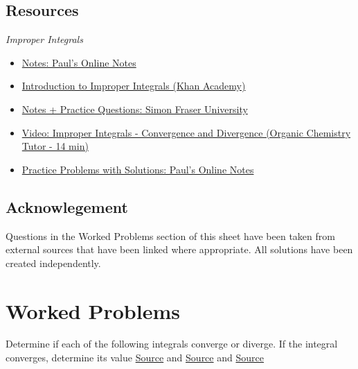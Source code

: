 \documentclass{article}
\begin{document}
\subsection*{Resources}
\noindent\textit{Improper Integrals}
\begin{itemize}
    \item \href{https://tutorial.math.lamar.edu/classes/calcii/improperintegrals.aspx}{Notes: Paul's Online Notes}
    \item \href{https://www.khanacademy.org/math/ap-calculus-bc/bc-integration-new/bc-6-13/v/introduction-to-improper-integrals}{Introduction to Improper Integrals (Khan Academy)}
    \item \href{https://www.sfu.ca/math-coursenotes/Math%20158%20Course%20Notes/sec_ImproperIntegrals.html}{Notes + Practice Questions: Simon Fraser University}
    \item \href{https://youtu.be/ND9cEdfCFr0}{Video: Improper Integrals - Convergence and Divergence (Organic Chemistry Tutor - 14 min)}
    \item \href{https://tutorial.math.lamar.edu/problems/calcii/improperintegrals.aspx}{Practice Problems with Solutions: Paul's Online Notes}
\end{itemize}


\subsection*{Acknowlegement}
Questions in the Worked Problems section of this sheet have been taken from external sources that have been linked where appropriate. All solutions have been created independently.

\pagebreak
\section*{Worked Problems}
\hypertarget{WorkedProblems}{}

Determine if each of the following integrals converge or diverge. If the integral converges, determine its value
\newline \href{https://tutorial.math.lamar.edu/problems/calcii/improperintegrals.aspx}{Source} and \href{https://web.math.ucsb.edu/~vtkala/2014/Math3B/Math3B-ImproperIntegrals-Solutions.pdf}{Source} and \href{https://people.math.sc.edu/josephcf/Teaching/142/Files/Worksheets/Improper%20Integrals.pdf}{Source}
\end{document}
